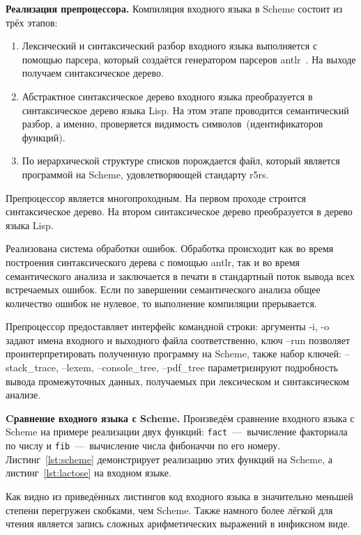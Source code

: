 \documentclass[12pt,a4paper,oneside]{extarticle}
\begin{document}
\noindent\textbf{Реализация препроцессора.}
    Компиляция входного языка в Scheme состоит из трёх этапов:

    \begin{enumerate}
        \item Лексический и синтаксический разбор входного языка выполняется с помощью парсера, который создаётся генератором парсеров antlr~\cite{antlr}. 
              На выходе получаем синтаксическое дерево.
        \item Абстрактное синтаксическое дерево входного языка преобразуется в синтаксическое дерево языка Lisp.
              На этом этапе проводится семантический разбор, а именно, проверяется видимость символов~(идентификаторов функций).
        \item По иерархической структуре списков порождается файл, который является программой на Scheme, удовлетворяющей стандарту r5rs. 
    \end{enumerate}

    Препроцессор является многопроходным. На первом проходе строится синтаксическое дерево. На втором синтаксическое дерево преобразуется в дерево языка Lisp.

    Реализована система обработки ошибок. Обработка происходит как во время построения синтаксического дерева с помощью antlr, так и во время семантического анализа и заключается в печати в стандартный поток вывода всех встречаемых ошибок. Если по завершении семантического анализа общее количество ошибок не нулевое, то выполнение компиляции прерывается.
            
    Препроцессор предоставляет интерфейс командной строки: аргументы -i, -o задают имена входного и выходного файла соответственно, ключ --run позволяет проинтерпретировать полученную программу на Scheme, также набор ключей: --stack_trace, --lexem, --console_tree, --pdf_tree параметризируют подробность вывода промежуточных данных, получаемых при лексическом и синтаксическом анализе.


\noindent\textbf{Cравнение входного языка с Scheme.}
    Произведём сравнение входного языка с Scheme на примере реализации двух функций: \lstinline$fact$~---~вычисление факториала по числу и \lstinline$fib$~---~вычисление числа фибоначчи по его номеру. 
    Листинг~\ref{lst:scheme} демонстрирует реализацию этих функций на Scheme, а листинг~\ref{lst:lactose} на входном языке. 

    Как видно из приведённых листингов код входного языка в значительно меньшей степени перегружен скобками, чем Scheme. Также намного более лёгкой для чтения является запись сложных арифметических выражений в инфиксном виде.    
    
\end{document}
